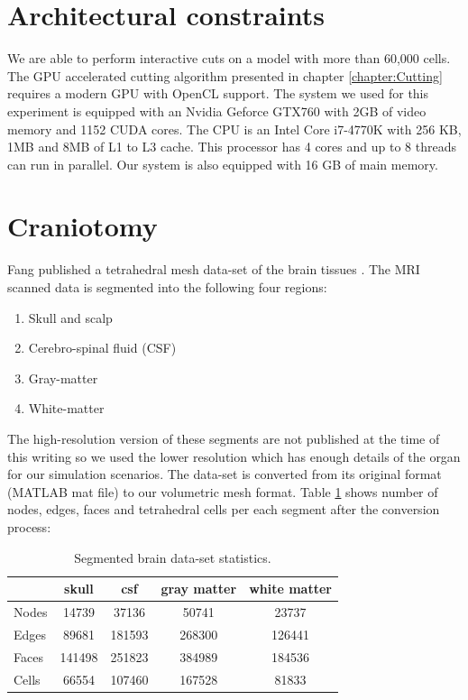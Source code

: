 \section{Architectural constraints}
We are able to perform interactive cuts on a model with more than 60,000 cells. The GPU accelerated cutting algorithm 
presented in chapter \ref{chapter:Cutting} requires a modern GPU with OpenCL support. The system we used for this
experiment is equipped with an Nvidia Geforce GTX760 with 2GB of video memory and 1152 CUDA cores. The CPU is an 
Intel Core i7-4770K with 256 KB, 1MB and 8MB of L1 to L3 cache. This processor has 4 cores and up to 8 threads can run in parallel. 
Our system is also equipped with 16 GB of main memory. 

\section{Craniotomy}
Fang \etal published a tetrahedral mesh data-set of the brain tissues \cite{fang2010mesh}. The MRI scanned data is 
segmented into the following four regions:

\begin{enumerate}
 \item Skull and scalp
 \item Cerebro-spinal fluid (CSF)
 \item Gray-matter
 \item White-matter
\end{enumerate}

The high-resolution version of these segments are not published at the time of this writing so we used the lower resolution 
which has enough details of the organ for our simulation scenarios. The data-set is converted from its original format 
(MATLAB mat file) to our volumetric mesh format. Table \ref{table:brainmesh} shows number of nodes, edges, faces and tetrahedral cells 
per each segment after the conversion process:

\begin{table}[H]
\begin{center}
\caption{\label{table:brainmesh}{Segmented brain data-set statistics.}}
  \begin{tabular}{ | l | c | c | c | c |}
    \hline    
     & skull & csf & gray matter & white matter \\ \hline \hline    
    Nodes & 14739 & 37136 & 50741 & 23737  \\ \hline
    Edges & 89681 & 181593 & 268300 & 126441 \\ \hline
    Faces & 141498 & 251823 & 384989 & 184536 \\ \hline
    Cells & 66554 & 107460 & 167528 & 81833 \\ \hline
    \hline
  \end{tabular}
\end{center}
\end{table}

